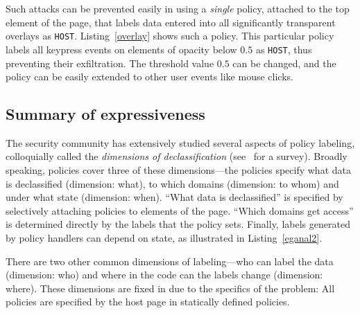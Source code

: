 Such attacks can be prevented easily in {\sys} using a \emph{single}
policy, attached to the top element of the page, that labels data
entered into all significantly transparent overlays as
\texttt{HOST}. Listing~\ref{overlay} shows such a policy. This
particular policy labels all keypress events on elements of opacity
below $0.5$ as \texttt{HOST}, thus preventing their exfiltration. The
threshold value $0.5$ can be changed, and the policy can be easily
extended to other user events like mouse clicks.

\subsection{Summary of {\sys} expressiveness} 
The security community has extensively studied several
aspects of policy labeling, colloquially called the \emph{dimensions
  of declassification} (see~\cite{dimDecl} for a survey). Broadly
speaking, {\sys} policies cover three of these dimensions---the
policies specify what data is declassified (dimension: what), to which
domains (dimension: to whom) and under what state (dimension:
when). ``What data is declassified'' is specified by selectively
attaching policies to elements of the page. ``Which domains get
access'' is determined directly by the labels that the policy
sets. Finally, labels generated by policy handlers can depend on
state, as illustrated in Listing~\ref{eganal2}.

There are two other common dimensions of labeling---who can label the
data (dimension: who) and where in the code can the labels change
(dimension: where). These dimensions are fixed in {\sys} due to the
specifics of the problem: All policies are specified by the host page
in statically defined policies.

